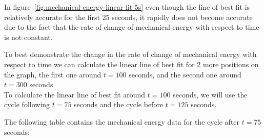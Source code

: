 \documentclass[titlepage]{article}
\begin{document}
            In figure~\ref{fig:mechanical-energy-linear-fit-5s} even though the line of best fit is relatively accurate for the first 25 seconds, it rapidly does not become accurate due to the fact that the rate of change of mechanical energy with respect to time is not constant.
            
            To best demonstrate the change in the rate of change of mechanical energy with respect to time we can calculate the linear line of best fit for 2 more positions on the graph, the first one around $t=100$ seconds, and the second one around $t=300$ seconds.\\
            \newline \indent To calculate the linear line of best fit around $t=100$ seconds, we will use the cycle following $t=75$ seconds and the cycle before $t=125$ seconds.
            
            The following table contains the mechanical energy data for the cycle after $t=75$ seconds:
            
\end{document}
